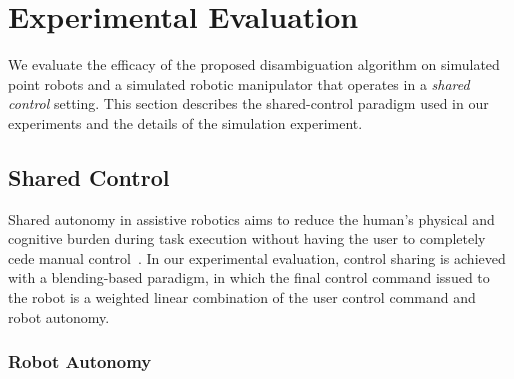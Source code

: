 \documentclass[letterpaper, 10 pt, conference]{ieeeconf}  %
\begin{document}
\section{Experimental Evaluation}\label{sec:ed}
We evaluate the efficacy of the proposed disambiguation algorithm on simulated point robots and a simulated robotic manipulator that operates in a \textit{shared control} setting. This section describes the shared-control paradigm used in our experiments and the details of the simulation experiment. 
\subsection{Shared Control}\label{ssec:shared-control}
Shared autonomy in assistive robotics aims to reduce the human's physical and cognitive burden during task execution without having the user to completely cede manual control~\cite{muelling2017autonomy}. 
In our experimental evaluation, control sharing is achieved with a blending-based paradigm, in which the final control command issued to the robot is a weighted linear combination of the user control command and robot autonomy.
\subsubsection{Robot Autonomy}\label{sssec:autonomy}
\end{document}
